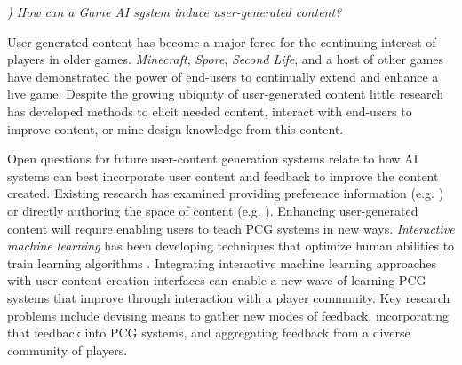 \documentclass[conference]{IEEEtran}
\newcounter{questionno}
\newcommand{\subsubsectionx}[1]{{\em {\arabic{questionno}) #1}}
	\addtocounter{questionno}{1}
	}
\begin{document}


\subsubsectionx{How can a Game AI system induce user-generated content?}
%
User-generated content has become a major force for the continuing interest of players in older games.
{\em Minecraft}, {\em Spore}, {\em Second Life}, and a host of other games have demonstrated the power of end-users to continually extend and enhance a live game.
Despite the growing ubiquity of user-generated content little research has developed methods to elicit needed content, interact with end-users to improve content, or mine design knowledge from this content.

Open questions for future user-content generation systems relate to how AI systems can best incorporate user content and feedback to improve the content created. 
Existing research has examined providing preference information (e.g. \cite{hastings2009:gar, risi2012:petalz}) or directly authoring the space of content (e.g. \cite{smith2011:tanagra, smith2010:variations, dormans2009:machinations}). 
Enhancing user-generated content will require enabling users to teach PCG systems in new ways.
{\em Interactive machine learning} has been developing techniques that optimize human abilities to train learning algorithms \cite{amershi2011:interactive-ml-interaction}. 
Integrating interactive machine learning approaches with user content creation interfaces can enable a new wave of learning PCG systems that improve through interaction with a player community. 
Key research problems include devising means to gather new modes of feedback, incorporating that feedback into PCG systems, and aggregating feedback from a diverse community of players.
\end{document}
